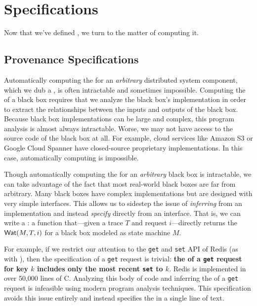\section{\WatProvenance{} Specifications}
Now that we've defined \watprovenance{}, we turn to the matter of computing it.

\subsection{Provenance Specifications}
Automatically computing the \watprovenance{} for an \emph{arbitrary}
distributed system component, which we dub a , is often
intractable and sometimes impossible. Computing the \watprovenance{} of a black
box requires that we analyze the black box's implementation in order to extract
the relationships between the inputs and outputs of the black box. Because
black box implementations can be large and complex, this program analysis is
almost always intractable. Worse, we may not have access to the source code of
the black box at all. For example, cloud services like Amazon S3 or Google
Cloud Spanner have closed-source proprietary implementations. 
In this case,
automatically computing \watprovenance{} is impossible.

\newcommand{\kvget}{\texttt{get}}
\newcommand{\kvset}{\texttt{set}}

Though automatically computing the \watprovenance{} for an \emph{arbitrary}
black box is intractable, we can take advantage of the fact that most
real-world black boxes are far from arbitrary. Many black boxes have complex
implementations but are designed with very simple interfaces.  This allows us
to sidestep the issue of \emph{inferring} \watprovenance{} from an
implementation and instead \emph{specify} \watprovenance{} directly from an
interface. That is, we can write a : a
function that---given a trace $T$ and request $i$---directly returns the
\watprovenance{} $\textsf{Wat}(M, T, i)$ for a black box modeled as state machine $M$.

For example, if we restrict our attention to the \kvget{} and \kvset{} API of
Redis (as with ), then the \watprovenance{}
specification of a \kvget{} request is trivial: \textbf{the \watprovenance{} of
a \kvget{} request for key $k$ includes only the most recent \kvset{} to
$k$}. Redis is implemented in over 50,000 lines of C. Analyzing this body of
code and inferring the \watprovenance{} of a \kvget{} request is infeasible
using modern program analysis techniques. This \watprovenance{} specification
avoids this issue entirely and instead specifies the \watprovenance{} in a
single line of text.

